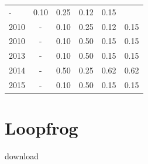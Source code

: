 \begin{table}[H]
\begin{tabular}{| l | c | c | c | c | c |}
          -
          &
          0.10
          &
          0.25
          &
          0.12
          &
            {\color{red} 0.15}
          \\
            2010
          &
          -
          &
          0.10
          &
          0.25
          &
          0.12
          &
            {\color{red} 0.15}
          \\
            2010
          &
          -
          &
          0.10
          &
          0.50
          &
          0.15
          &
            {\color{red} 0.15}
          \\
\hline
            2013
          &
          -
          &
          0.10
          &
          0.50
          &
          0.15
          &
            {\color{red} 0.15}
          \\
\hline
            2014
          &
          -
          &
          0.50
          &
          0.25
          &
          0.62
          &
            {\color{blue} 0.62}
          \\
\hline
            2015
          &
          -
          &
          0.10
          &
          0.50
          &
          0.15
          &
            {\color{red} 0.15}
          \\
\hline
\end{tabular}
\end{table}



\section{Loopfrog}
\checkmark download


